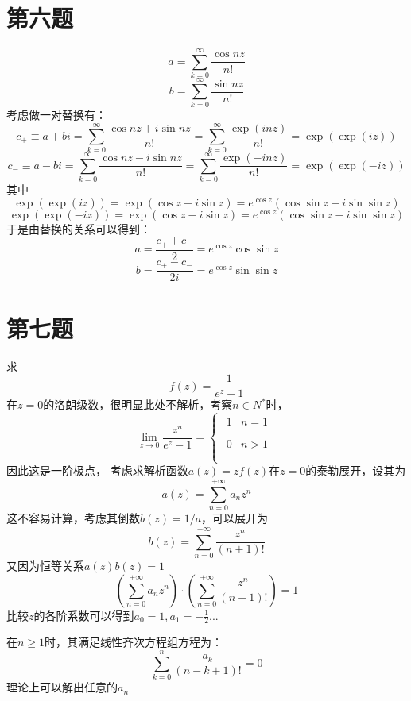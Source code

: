 \documentclass[a4paper]{ctexart}
\begin{document}
\section{第六题}
$$a=\sum_{k=0}^{\infty} \frac{\cos n z}{n !} $$
$$b=\sum_{k=0}^{\infty} \frac{\sin n z}{n !} $$
考虑做一对替换有：
$$
    c_+\equiv a+bi=\sum_{k=0}^{\infty}{\frac{\cos nz+i\sin nz}{n!}}=\sum_{k=0}^{\infty}{\frac{\exp \left( inz \right)}{n!}}=\exp \left( \exp \left( iz \right) \right)
$$
$$
    c_-\equiv a-bi=\sum_{k=0}^{\infty}{\frac{\cos nz-i\sin nz}{n!}}=\sum_{k=0}^{\infty}{\frac{\exp \left( -inz \right)}{n!}}=\exp \left( \exp \left( -iz \right) \right)
$$
其中
$$
    \exp \left( \exp \left( iz \right) \right) =\exp \left( \cos z+i\sin z \right) =e^{\cos z}\left( \cos\sin z+i\sin\sin z \right)
$$
$$
    \exp \left( \exp \left( -iz \right) \right) =\exp \left( \cos z-i\sin z \right) =e^{\cos z}\left( \cos\sin z-i\sin\sin z \right)
$$
于是由替换的关系可以得到：
$$
    a=\frac{c_++c_-}{2}=e^{\cos z}\cos\sin z
$$
$$
    b=\frac{c_+-c_-}{2i}=e^{\cos z}\sin\sin z
$$

\section{第七题}
求
$$
    f\left( z \right) =\frac{1}{e^z-1}
$$
在$z=0$的洛朗级数，很明显此处不解析，考察$n\in N^*$时，
$$
    \underset{z\rightarrow 0}{\lim}\frac{z^n}{e^z-1}=\left\{ \begin{array}{l}
        \begin{matrix}
            1 & n=1 \\
        \end{matrix} \\
        \begin{matrix}
            0 & n>1 \\
        \end{matrix} \\
    \end{array} \right.
$$
因此这是一阶极点，
考虑求解析函数$a(z)=zf(z)$在$z=0$的泰勒展开，设其为
$$
    a\left( z \right) =\sum_{n=0}^{+\infty}{a_nz^n}
$$
这不容易计算，考虑其倒数$b(z)=1/a$，可以展开为
$$
    b\left( z \right) =\sum_{n=0}^{+\infty}{\frac{z^n}{\left( n+1 \right) !}}
$$
又因为恒等关系$a(z)b(z)=1$
$$
    \left( \sum_{n=0}^{+\infty}{a_nz^n} \right) \cdot \left( \sum_{n=0}^{+\infty}{\frac{z^n}{\left( n+1 \right) !}} \right) =1
$$
比较$z$的各阶系数可以得到$a_0=1,a_{1}=-\frac{1}{2}$...

在$n\geq 1$时，其满足线性齐次方程组方程为：
$$
    \sum_{k=0}^n{\frac{a_k}{\left( n-k+1 \right) !}}=0
$$
理论上可以解出任意的$a_n$
\end{document}
